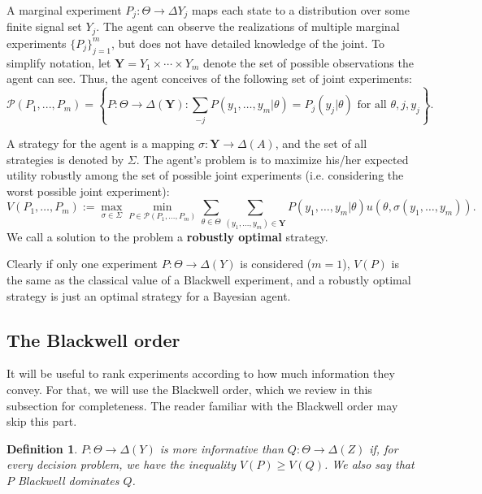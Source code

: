 \documentclass[11pt]{article}
\theoremstyle{plain}
\newtheorem{defn}{Definition}
\theoremstyle{remark}
\begin{document}
A marginal experiment $P_j:\Theta\rightarrow\Delta Y_j$ maps each state to a distribution over some finite signal set $Y_j$. The agent can observe the realizations of multiple marginal experiments $\{P_j\}_{j=1}^m$, but does not have detailed knowledge of the joint. To simplify notation, let $\mathbf{Y}=Y_1\times \cdots \times Y_m$ denote the set of possible observations the agent can see. Thus, the agent conceives of the following set of joint experiments:
	\[
	\mathcal{P}(P_1,...,P_m)=\left\{
	P:\Theta\rightarrow \Delta(\mathbf{Y}):
	\sum_{-j}P(y_1,\ldots,y_m|\theta)=P_j(y_j|\theta)\text{ for all }\theta,j,y_j
	\right\}.
	\]
	
A strategy for the agent is a mapping $\sigma:\mathbf{Y}\rightarrow \Delta (A)$, and the set of all strategies is denoted by $\Sigma$.
The agent's problem is to maximize his/her expected utility robustly among the set of possible joint experiments (i.e. considering the worst possible joint experiment):
	\[
	V(P_1, \ldots , P_m):= \max_{\sigma\in\Sigma} \min_{P \in \mathcal{P}(P_1, \ldots , P_m)} \sum_{\theta\in\Theta}\sum_{(y_1, \ldots , y_m) \in \mathbf{Y}} P(y_1, \ldots , y_m|\theta)u(\theta,\sigma(y_1, \ldots , y_m)).
	\]
We call a solution to the problem a \textbf{robustly optimal} strategy.
	
 Clearly if only one experiment $P:\Theta\rightarrow \Delta (Y)$ is considered ($m=1$), $V(P)$ is the same as the classical value of a Blackwell experiment, and a robustly optimal strategy is just an optimal strategy for a Bayesian agent.



\subsection{The Blackwell order }

It will be useful to rank experiments according to how much information they convey. For that, we will use the Blackwell order, which we review in this subsection for completeness. The reader familiar with the Blackwell order may skip this part. 

\begin{defn}
$P:\Theta\rightarrow\Delta(Y)$ is more informative than $Q:\Theta\rightarrow\Delta(Z)$  if, for every decision problem, we have the inequality $V(P)\geqslant V(Q)$. We also say that $P$ Blackwell dominates $Q$.
\end{defn}
\end{document}
